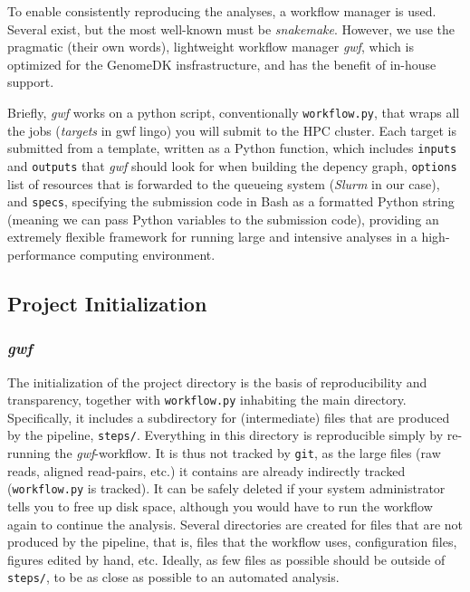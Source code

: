 \documentclass[
  11pt,
  a4paper,
]{scrbook}
\let\oldemph\emph
\renewcommand\emph[1]{\oldemph{\color{gray}#1}}
\begin{document}
To enable consistently reproducing the analyses, a workflow manager is
used. Several exist, but the most well-known must be \emph{snakemake}.
However, we use the pragmatic (their own words), lightweight workflow
manager \emph{gwf}, which is optimized for the GenomeDK insfrastructure,
and has the benefit of in-house support.

Briefly, \emph{gwf} works on a python script, conventionally
\texttt{workflow.py}, that wraps all the jobs (\emph{targets} in gwf
lingo) you will submit to the HPC cluster. Each target is submitted from
a template, written as a Python function, which includes \texttt{inputs}
and \texttt{outputs} that \emph{gwf} should look for when building the
depency graph, \texttt{options} list of resources that is forwarded to
the queueing system (\emph{Slurm} in our case), and \texttt{specs},
specifying the submission code in Bash as a formatted Python string
(meaning we can pass Python variables to the submission code), providing
an extremely flexible framework for running large and intensive analyses
in a high-performance computing environment.

\subsection{Project Initialization}\label{project-initialization}

\subsubsection{\texorpdfstring{\emph{gwf}}{gwf}}\label{gwf}

The initialization of the project directory is the basis of
reproducibility and transparency, together with \texttt{workflow.py}
inhabiting the main directory. Specifically, it includes a subdirectory
for (intermediate) files that are produced by the pipeline,
\texttt{steps/}. Everything in this directory is reproducible simply by
re-running the \emph{gwf}-workflow. It is thus not tracked by
\texttt{git}, as the large files (raw reads, aligned read-pairs, etc.)
it contains are already indirectly tracked (\texttt{workflow.py} is
tracked). It can be safely deleted if your system administrator tells
you to free up disk space, although you would have to run the workflow
again to continue the analysis. Several directories are created for
files that are not produced by the pipeline, that is, files that the
workflow uses, configuration files, figures edited by hand, etc.
Ideally, as few files as possible should be outside of \texttt{steps/},
to be as close as possible to an automated analysis.
\end{document}
